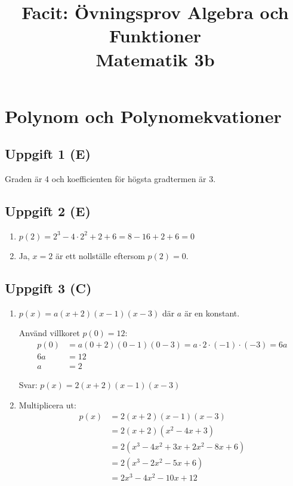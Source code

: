 \documentclass[12pt]{article}
\title{Facit: Övningsprov Algebra och Funktioner \\ \large Matematik 3b}
\author{}
\date{}
\begin{document}
\maketitle

\section{Polynom och Polynomekvationer}

\subsection*{Uppgift 1 (E)}
\begin{facitbox}
Graden är 4 och koefficienten för högsta gradtermen är 3.
\end{facitbox}

\subsection*{Uppgift 2 (E)}
\begin{facitbox}
\begin{enumerate}[label=\alph*)]
    \item $p(2) = 2^3 - 4 \cdot 2^2 + 2 + 6 = 8 - 16 + 2 + 6 = 0$
    \item Ja, $x = 2$ är ett nollställe eftersom $p(2) = 0$.
\end{enumerate}
\end{facitbox}

\subsection*{Uppgift 3 (C)}
\begin{facitbox}
\begin{enumerate}[label=\alph*)]
    \item $p(x) = a(x + 2)(x - 1)(x - 3)$ där $a$ är en konstant.
    
    Använd villkoret $p(0) = 12$:
    \begin{align*}
    p(0) &= a(0 + 2)(0 - 1)(0 - 3) = a \cdot 2 \cdot (-1) \cdot (-3) = 6a \\
    6a &= 12 \\
    a &= 2
    \end{align*}
    
    Svar: $p(x) = 2(x + 2)(x - 1)(x - 3)$
    
    \item Multiplicera ut:
    \begin{align*}
    p(x) &= 2(x + 2)(x - 1)(x - 3) \\
    &= 2(x + 2)(x^2 - 4x + 3) \\
    &= 2(x^3 - 4x^2 + 3x + 2x^2 - 8x + 6) \\
    &= 2(x^3 - 2x^2 - 5x + 6) \\
    &= 2x^3 - 4x^2 - 10x + 12
    \end{align*}
\end{enumerate}
\end{facitbox}
\end{document}
